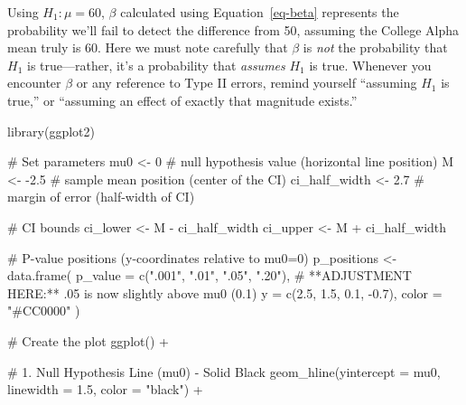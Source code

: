 \documentclass[
  letterpaper,
  DIV=11,
  numbers=noendperiod]{scrreprt}
\newenvironment{Shaded}{\begin{snugshade}}{\end{snugshade}}
\newcommand{\AttributeTok}[1]{\textcolor[rgb]{0.40,0.45,0.13}{#1}}
\newcommand{\CommentTok}[1]{\textcolor[rgb]{0.37,0.37,0.37}{#1}}
\newcommand{\DecValTok}[1]{\textcolor[rgb]{0.68,0.00,0.00}{#1}}
\newcommand{\FloatTok}[1]{\textcolor[rgb]{0.68,0.00,0.00}{#1}}
\newcommand{\FunctionTok}[1]{\textcolor[rgb]{0.28,0.35,0.67}{#1}}
\newcommand{\NormalTok}[1]{\textcolor[rgb]{0.00,0.23,0.31}{#1}}
\newcommand{\OtherTok}[1]{\textcolor[rgb]{0.00,0.23,0.31}{#1}}
\newcommand{\SpecialCharTok}[1]{\textcolor[rgb]{0.37,0.37,0.37}{#1}}
\newcommand{\StringTok}[1]{\textcolor[rgb]{0.13,0.47,0.30}{#1}}
\begin{document}
Using \(H_1: \mu = 60\), \(\beta\) calculated using
Equation~\ref{eq-beta} represents the probability we'll fail to detect
the difference from 50, assuming the College Alpha mean truly is 60.
Here we must note carefully that \(\beta\) is \emph{not} the probability
that \(H_1\) is true---rather, it's a probability that \emph{assumes}
\(H_1\) is true. Whenever you encounter \(\beta\) or any reference to
Type II errors, remind yourself ``assuming \(H_1\) is true,'' or
``assuming an effect of exactly that magnitude exists.''

\begin{Shaded}
\begin{Highlighting}[]
 \FunctionTok{library}\NormalTok{(ggplot2)}

\CommentTok{\# Set parameters}
\NormalTok{mu0 }\OtherTok{\textless{}{-}} \DecValTok{0}    \CommentTok{\# null hypothesis value (horizontal line position)}
\NormalTok{M }\OtherTok{\textless{}{-}} \SpecialCharTok{{-}}\FloatTok{2.5}   \CommentTok{\# sample mean position (center of the CI)}
\NormalTok{ci\_half\_width }\OtherTok{\textless{}{-}} \FloatTok{2.7} \CommentTok{\# margin of error (half{-}width of CI)}

\CommentTok{\# CI bounds}
\NormalTok{ci\_lower }\OtherTok{\textless{}{-}}\NormalTok{ M }\SpecialCharTok{{-}}\NormalTok{ ci\_half\_width}
\NormalTok{ci\_upper }\OtherTok{\textless{}{-}}\NormalTok{ M }\SpecialCharTok{+}\NormalTok{ ci\_half\_width}

\CommentTok{\# P{-}value positions (y{-}coordinates relative to mu0=0)}
\NormalTok{p\_positions }\OtherTok{\textless{}{-}} \FunctionTok{data.frame}\NormalTok{(}
  \AttributeTok{p\_value =} \FunctionTok{c}\NormalTok{(}\StringTok{".001"}\NormalTok{, }\StringTok{".01"}\NormalTok{, }\StringTok{".05"}\NormalTok{, }\StringTok{".20"}\NormalTok{),}
  \CommentTok{\# **ADJUSTMENT HERE:** .05 is now slightly above mu0 (0.1)}
  \AttributeTok{y =} \FunctionTok{c}\NormalTok{(}\FloatTok{2.5}\NormalTok{, }\FloatTok{1.5}\NormalTok{, }\FloatTok{0.1}\NormalTok{, }\SpecialCharTok{{-}}\FloatTok{0.7}\NormalTok{),}
  \AttributeTok{color =} \StringTok{"\#CC0000"}
\NormalTok{)}

\CommentTok{\# Create the plot}
\FunctionTok{ggplot}\NormalTok{() }\SpecialCharTok{+}
  
  \CommentTok{\# 1. Null Hypothesis Line (mu0) {-} Solid Black}
  \FunctionTok{geom\_hline}\NormalTok{(}\AttributeTok{yintercept =}\NormalTok{ mu0, }\AttributeTok{linewidth =} \FloatTok{1.5}\NormalTok{, }\AttributeTok{color =} \StringTok{"black"}\NormalTok{) }\SpecialCharTok{+} 
  

\end{Highlighting}
\end{Shaded}
\end{document}
